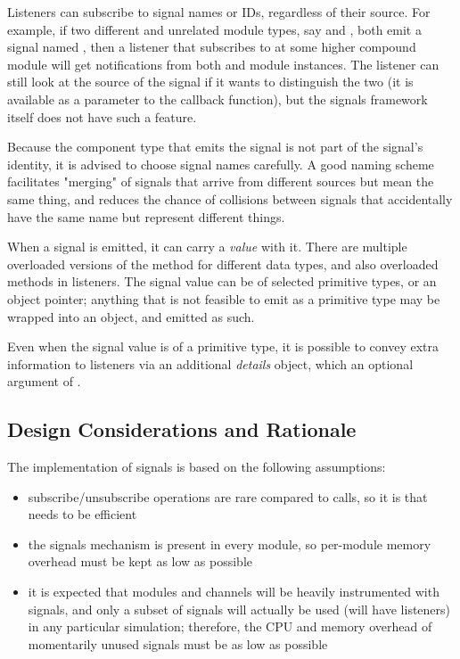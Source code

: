 Listeners can subscribe to signal names or IDs, regardless of their
source. For example, if two different and unrelated module types, say
 and , both emit a signal named , then
a listener that subscribes to  at some higher compound module
will get notifications from both  and  module
instances. The listener can still look at the source of the signal if it
wants to distinguish the two (it is available as a parameter to the
callback function), but the signals framework itself does not have such a
feature.

\begin{note}
  Because the component type that emits the signal is not part of the signal's
  identity, it is advised to choose signal names carefully. A good naming scheme
  facilitates "merging" of signals that arrive from different sources but
  mean the same thing, and reduces the chance of collisions between signals that
  accidentally have the same name but represent different things.
\end{note}

When a signal is emitted, it can carry a \textit{value} with it. There are
multiple overloaded versions of the  method for different
data types, and also overloaded  methods in
listeners. The signal value can be of selected primitive types, or an
object pointer; anything that is not feasible to emit as a primitive type
may be wrapped into an object, and emitted as such.

Even when the signal value is of a primitive type, it is possible to convey
extra information to listeners via an additional \textit{details} object,
which an optional argument of .


\subsection{Design Considerations and Rationale}
\label{sec:simple-modules:signals-design}

The implementation of signals is based on the following assumptions:

\begin{itemize}
  \item subscribe/unsubscribe operations are rare compared to 
    calls, so it is  that needs to be efficient
  \item the signals mechanism is present in every module, so per-module
    memory overhead must be kept as low as possible
  \item it is expected that modules and channels will be heavily instrumented
    with signals, and only a subset of signals will actually be used
    (will have listeners) in any particular simulation; therefore,
    the CPU and memory overhead of momentarily unused signals must be
    as low as possible
\end{itemize}

